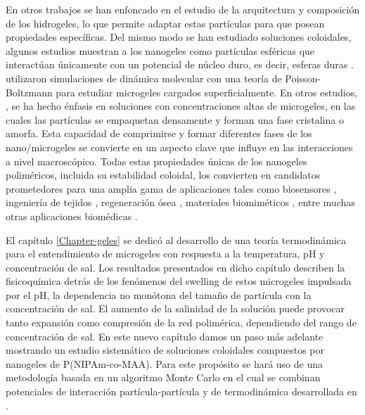 	En otros trabajos \cite{scotti2022softness, urich2016swelling} se han enfoncado en el estudio de la  arquitectura y composici\'on de los hidrogeles, lo que permite adaptar estas part\'iculas para que posean propiedades espec\'ificas.
	Del mismo modo se han estudiado soluciones coloidales, algunos estudios muestran a los nanogeles como part\'iculas esf\'ericas que interact\'uan \'unicamente con un potencial de n\'ucleo duro, es decir, esferas duras \cite{karg2019nanogels}. \citet{alziyadi2023osmotic} utilizaron simulaciones de din\'amica molecular con una teor\'ia de Poisson-Boltzmann para estudiar microgeles cargados superficialmente. En otros estudios, \cite{scotti2022softness, scheffold2020pathways}, se ha hecho \'enfasis en soluciones con concentraciones altas de microgeles, en las cuales las part\'iculas se empaquetan densamente y forman una fase cristalina o amorfa. Esta capacidad de comprimirse y formar diferentes fases de los nano/microgeles se convierte en un aspecto clave que influye en las interacciones a nivel macrosc\'opico.
	Todas estas propiedades \'unicas de los nanogeles polim\'ericos, incluida su estabilidad coloidal, los convierten en candidatos prometedores para una amplia gama de aplicaciones tales como biosensores \cite{zhang2012ultrathin, islam2014responsive}, ingenier\'ia de tejidos \cite{matricardi2013interpenetrating, van2011biopolymer}, regeneraci\'on \'osea \cite{bai2018bioactive}, materiales biomim\'eticos \cite{green2016mimicking, wu2010multifunctional}, entre muchas otras aplicaciones biom\'edicas \cite{Daly2020}.
	
	El cap\'itulo \ref{Chapter-geles} se dedic\'o al desarrollo de una teor\'ia termodin\'amica para el entendimiento de microgeles con respuesta a la temperatura, pH y concentraci\'on de sal. Los resultados presentados en dicho cap\'itulo describen la fisicoqu\'imica detr\'as de los fen\'omenos del swelling de estos microgeles impulsada por el pH, la dependencia no mon\'otona del tama\~no de part\'icula con la concentraci\'on de sal. El aumento de la salinidad de la soluci\'on puede provocar tanto expansi\'on como compresi\'on de la red polim\'erica, dependiendo del rango de concentraci\'on de sal.
	En este nuevo cap\'itulo damos un paso m\'as adelante mostrando un estudio sistem\'atico de soluciones coloidales compuestos por nanogeles de P(NIPAm-co-MAA). Para este prop\'osito se har\'a uso de una metodolog\'ia basada en un algoritmo Monte Carlo en el cual se combinan potenciales de interacci\'on part\'icula-part\'icula y de termodin\'amica desarrollada en \cite{perez2021thermodynamic}. 
	
